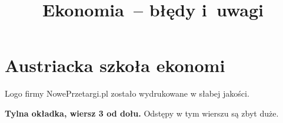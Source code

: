 \documentclass[a4paper,11pt]{article}
\title{Ekonomia~-- błędy i~uwagi}
\begin{document}





\maketitle %





\section{Austriacka szkoła ekonomi}

\vspace{\spaceTwo}







 Logo firmy NowePrzetargi.pl zostało wydrukowane w słabej jakości.

\vspace{\spaceFour}



\start \textbf{Tylna okładka, wiersz 3 od dołu.} Odstępy w tym wierszu są zbyt duże.








\end{document}
